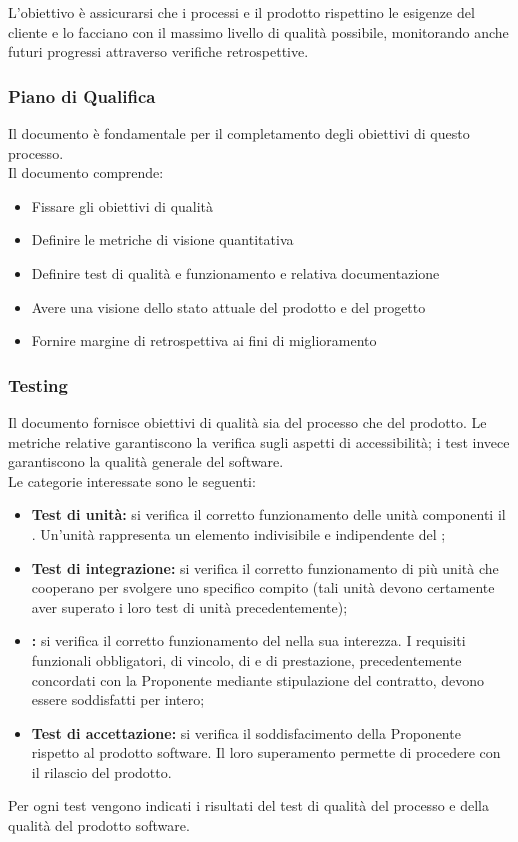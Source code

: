 L'obiettivo è assicurarsi che i processi e il prodotto rispettino le esigenze del cliente e lo facciano con il massimo livello di qualità possibile, monitorando anche futuri progressi attraverso verifiche retrospettive.
\subsubsection{Piano di Qualifica}
Il documento  è fondamentale per il completamento degli obiettivi di questo processo. 
\\Il documento comprende:
\begin{itemize}
    \item{Fissare gli obiettivi di qualità}
    \item{Definire le metriche di visione quantitativa}
    \item{Definire test di qualità e funzionamento e relativa documentazione}
    \item{Avere una visione dello stato attuale del prodotto e del progetto}
    \item{Fornire margine di retrospettiva ai fini di miglioramento}
\end{itemize}
\subsubsection{Testing}
Il documento  fornisce obiettivi di qualità sia del processo che del prodotto. Le metriche relative garantiscono la verifica sugli aspetti di accessibilità; i test invece garantiscono la qualità generale del software. 
\\Le categorie interessate sono le seguenti:
\begin{itemize}
	\item \textbf{Test di unità:} si verifica il corretto funzionamento delle unità componenti il . Un’unità rappresenta un elemento indivisibile e indipendente del ; 
	\item \textbf{Test di integrazione:} si verifica il corretto funzionamento di più unità che cooperano per svolgere uno specifico compito (tali unità devono certamente aver superato i loro test di unità precedentemente);
	\item \textbf{:} si verifica il corretto funzionamento del  nella sua interezza. I requisiti funzionali obbligatori, di vincolo, di  e di prestazione, precedentemente concordati con la Proponente mediante stipulazione del contratto, devono essere soddisfatti per intero;
	\item \textbf{Test di accettazione:} si verifica il soddisfacimento della Proponente rispetto al prodotto software. Il loro superamento permette di procedere con il rilascio del prodotto.
\end{itemize}
Per ogni test vengono indicati i risultati del test di qualità del processo e della qualità del prodotto software.
